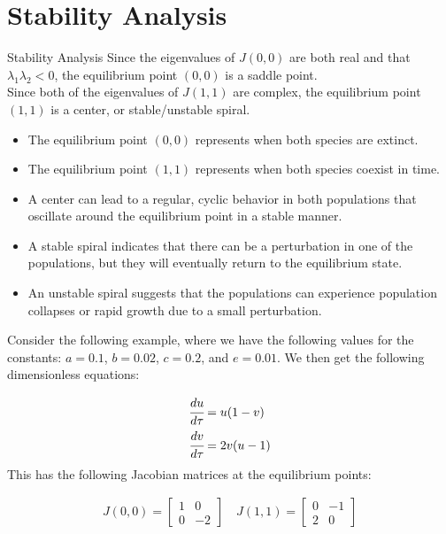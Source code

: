 \documentclass[10pt]{beamer}
\begin{document}
\section{Stability Analysis}
\begin{frame}{Stability Analysis}
    Since the eigenvalues of $J(0, 0)$ are both real and that $\lambda_1
        \lambda_2 < 0$, the equilibrium point $(0, 0)$ is a saddle point.
    \\
    Since both of the eigenvalues of $J(1, 1)$ are complex, the equilibrium
    point $(1, 1)$ is a center, or stable/unstable spiral.

    \begin{itemize}
        \item The equilibrium point $(0, 0)$ represents when both species are
              extinct.
        \item The equilibrium point $(1, 1)$ represents when both species
              coexist in time.
        \item A center can lead to a regular, cyclic behavior in both
              populations that oscillate around the equilibrium point in a stable manner.
        \item A stable spiral indicates that there can be a perturbation in one
              of the populations, but they will eventually return to the equilibrium state.
        \item An unstable spiral suggests that the populations can experience
              population collapses or rapid growth due to a small perturbation.
    \end{itemize}
\end{frame}

\begin{frame}
    Consider the following example, where we have the following values for the
    constants:
    $a = 0.1$, $b = 0.02$, $c = 0.2$, and $e = 0.01$. We then get the following
    dimensionless equations:

    \begin{align*}
        \cfrac{du}{d\tau} & = u(1 - v) \\
        \cfrac{dv}{d\tau} & = 2v(u-1)
    \end{align*}
    This has the following Jacobian matrices at the equilibrium points:

    \begin{align*}
        J(0, 0) = \begin{bmatrix}
                      1 & 0  \\
                      0 & -2
                  \end{bmatrix}
        \quad
        J(1, 1) = \begin{bmatrix}
                      0 & -1 \\
                      2 & 0
                  \end{bmatrix}
    \end{align*}
\end{frame}
\end{document}
